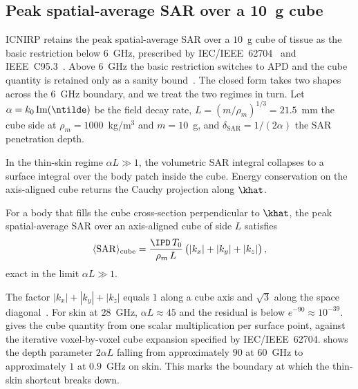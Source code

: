 \subsection{Peak spatial-average SAR over a 10~g cube}
\label{subsec:compl-cube}
ICNIRP retains the peak spatial-average SAR over a $10$~g cube of
tissue as the basic restriction below $6$~GHz, prescribed by
IEC/IEEE~62704~\cite{62704-1} and IEEE~C95.3~\cite{C953}. Above
$6$~GHz the basic restriction switches to \gls{APD} and the cube
quantity is retained only as a sanity
bound~\cite{Hirata2021,Samaras2019}. The closed form takes two
shapes across the $6$~GHz boundary, and we treat the two regimes
in turn. Let $\alpha = k_0\,\mathrm{Im}(\ntilde)$ be the field decay
rate, $L = (m/\rho_m)^{1/3} = 21.5$~mm the cube side at
$\rho_m = 1000$~kg/m$^3$ and $m = 10$~g, and $\delta_{\mathrm{SAR}}
= 1/(2\alpha)$ the SAR penetration depth.

In the thin-skin regime $\alpha L \gg 1$, the volumetric SAR integral
collapses to a surface integral over the body patch inside the cube.
Energy conservation on the axis-aligned cube returns the Cauchy
projection along $\khat$.

\begin{corollary}\label{cor:cube}
For a body that fills the cube cross-section perpendicular to
$\khat$, the peak spatial-average SAR over an axis-aligned cube of
side $L$ satisfies
\begin{equation}\label{eq:cube}
  \langle\mathrm{SAR}\rangle_{\mathrm{cube}}
  = \frac{\IPD\,T_0}{\rho_m\,L}\,
    \bigl(|k_x| + |k_y| + |k_z|\bigr)\, ,
\end{equation}
exact in the limit $\alpha L \gg 1$.
\end{corollary}

The factor $|k_x| + |k_y| + |k_z|$ equals $1$ along a cube axis and
$\sqrt{3}$ along the space diagonal~\cite{Cauchy1841}. For skin at
$28$~GHz, $\alpha L \approx 45$ and the residual is below
$e^{-90} \approx 10^{-39}$.  gives the cube quantity
from one scalar multiplication per surface point, against the
iterative voxel-by-voxel cube expansion specified by IEC/IEEE~62704.
 shows the depth parameter $2\alpha L$ falling from
approximately $90$ at $60$~GHz to approximately $1$ at $0.9$~GHz on
skin. This
marks the boundary at which the thin-skin shortcut breaks down.

